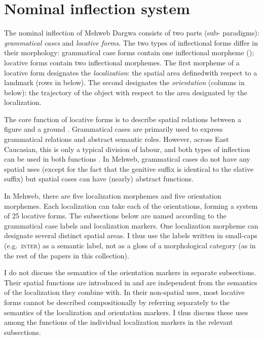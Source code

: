 ﻿\documentclass[output=paper]{langsci/langscibook}
\begin{document}
\section{Nominal inflection system}
\label{nominal-inflection-system}


The nominal inflection of Mehweb Dargwa consists of two parts
(sub-\hskip0pt paradigms): \emph{grammatical cases} and \emph{locative forms}. The
two types of inflectional forms differ in their morphology: grammatical
case forms contain one inflectional morpheme (); locative forms
contain two inflectional morphemes. The first morpheme of a locative
form designates the \emph{localization}: the spatial area defined\pagebreak[3] with
respect to a landmark (rows in  below). The second 
designates the \emph{orientation} (columns in  below): the
trajectory of the object with respect to the area designated by the
localization.



The core function of locative forms is to describe spatial relations 
between a figure and a ground \citep{rubin2001}.
Grammatical cases are primarily used to express grammatical relations
and abstract semantic roles. However, across East Caucasian, this is
only a typical division of labour, and both types of inflection can be
used in both functions \citep{kibrik2003}. In Mehweb, grammatical cases do
not have any spatial uses (except for the fact that the genitive suffix is
identical to the elative suffix) but spatial cases can have (nearly)
abstract functions.



In Mehweb, there are five localization morphemes and five orientation
morphemes. Each localization can take each of the orientations, forming
a system of 25 locative forms. The subsections below are named according to the
grammatical case labels and localization markers. One localization
morpheme can designate several distinct spatial areas. I thus use the
labels written in small-caps (e.g.\ \textsc{inter}) as a semantic label,
not as a gloss of a morphological category (as in the rest of the papers
in this collection).

I do not discuss the semantics of the orientation markers in separate
subsections. Their spatial functions are introduced in  and are
independent from the semantics of the localization they combine with. In
their non-spatial uses, most locative forms cannot be described
compositionally by referring separately to the semantics of the
localization and orientation markers. I thus discuss these uses among
the functions of the individual localization markers in the relevant
subsections.
\end{document}
